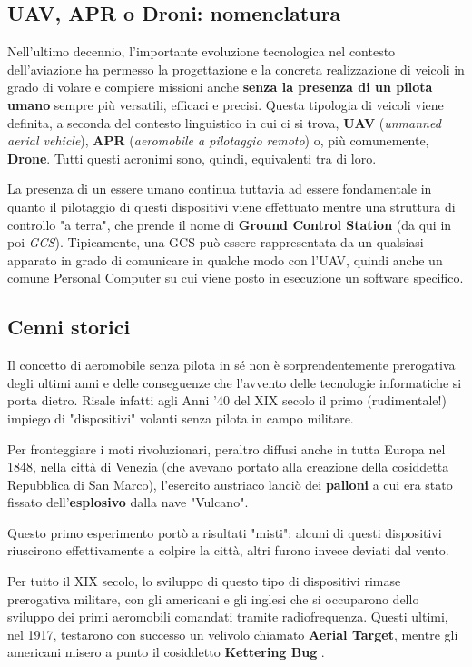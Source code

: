 \documentclass[a4paper, 12pt, oneside]{article}
\begin{document}
\newpage


\subsection{UAV, APR o Droni: nomenclatura}
Nell'ultimo decennio, l'importante evoluzione tecnologica nel contesto dell'aviazione ha permesso la progettazione e la concreta realizzazione di veicoli in grado di volare e compiere missioni anche \textbf{senza la presenza di un pilota umano} sempre più versatili, efficaci e precisi. Questa tipologia di veicoli viene definita, a seconda del contesto linguistico in cui ci si trova, \textbf{UAV} (\textit{unmanned aerial vehicle}), \textbf{APR} (\textit{aeromobile a pilotaggio remoto}) o, più comunemente, \textbf{Drone}. Tutti questi acronimi sono, quindi, equivalenti tra di loro. 

La presenza di un essere umano continua tuttavia ad essere fondamentale in quanto il pilotaggio di questi dispositivi viene effettuato mentre una struttura di controllo "a terra", che prende il nome di \textbf{Ground Control Station} (da qui in poi \textit{GCS}). Tipicamente, una GCS può essere rappresentata da un qualsiasi apparato in grado di comunicare in qualche modo con l'UAV, quindi anche un comune Personal Computer su cui viene posto in esecuzione un software specifico.

\subsection{Cenni storici}
Il concetto di aeromobile senza pilota in sé non è sorprendentemente prerogativa degli ultimi anni e delle conseguenze che l'avvento delle tecnologie informatiche si porta dietro. Risale infatti agli Anni '40 del XIX secolo il primo (rudimentale!) impiego di "dispositivi" volanti senza pilota in campo militare. 

Per fronteggiare i moti rivoluzionari, peraltro diffusi anche in tutta Europa nel 1848, nella città di Venezia (che avevano portato alla creazione della cosiddetta Repubblica di San Marco), l'esercito austriaco lanciò dei \textbf{palloni} a cui era stato fissato dell'\textbf{esplosivo} dalla nave "Vulcano". 

Questo primo esperimento portò a risultati "misti": alcuni di questi dispositivi riuscirono effettivamente a colpire la città, altri furono invece deviati dal vento.

Per tutto il XIX secolo, lo sviluppo di questo tipo di dispositivi rimase prerogativa militare, con gli americani e gli inglesi che si occuparono dello sviluppo dei primi aeromobili comandati tramite radiofrequenza. Questi ultimi, nel 1917, testarono con successo un velivolo chiamato \textbf{Aerial Target}, mentre gli americani misero a punto il cosiddetto \textbf{Kettering Bug} \cite{drones-history}.
\end{document}
